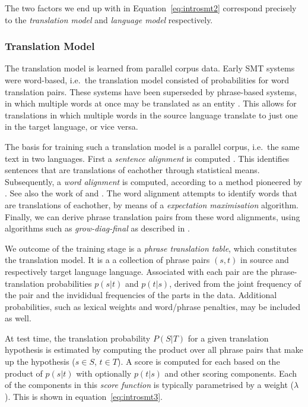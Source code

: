 The two factors we end up with in Equation~\ref{eq:introsmt2} correspond
precisely to the \emph{translation model} and \emph{language model} respectively.

\subsubsection{Translation Model}

The translation model is learned from parallel corpus data. Early SMT systems
were word-based, i.e.\ the translation model consisted of probabilities for
word translation pairs. These systems have been superseded by phrase-based
systems, in which multiple words at once may be translated as an entity
\citep{PBSMT}. This allows for translations in which multiple words in the
source language translate to just one in the target language, or vice versa.

The basis for training such a translation model is a parallel corpus, i.e.\ the
same text in two languages. First a \emph{sentence alignment} is computed
\citep{TIEDEMANN}. This identifies sentences that are translations of eachother
through statistical means. Subsequently, a \emph{word alignment} is computed,
according to a method pioneered by \cite{BROWN}. See also the work of
\cite{OchNey2003} and \citep{TIEDEMANN}. The word alignment attempts to
identify words that are translations of eachother, by means of a
\emph{expectation maximisation} algorithm. Finally, we can derive phrase
translation pairs from these word alignments, using algorithms such as
\emph{grow-diag-final} as described in \citep{PBSMT}. 

We outcome of the training stage is a \emph{phrase translation table}, which
constitutes the translation model. It is a a collection of phrase pairs $(s,t)$
in source and respectively target language language. Associated with each pair
are the phrase-translation probabilities $p(s|t)$ and $p(t|s)$, derived from
the joint frequency of the pair and the invididual frequencies of the parts in
the data. Additional probabilities, such as lexical weights and word/phrase
penalties, may be included as well. 

At test time, the translation probability $P(S|T)$ for a given translation
hypothesis is estimated by computing the product over all phrase pairs that
make up the hypothesis ($s \in S$, $t \in T$). A score is computed for each
based on the product of $p(s|t)$ with optionally $p(t|s)$ and other scoring
components. Each of the components in this \emph{score function} 
is typically parametrised by a weight ($\lambda$). This is shown in equation~\ref{eq:introsmt3}.

